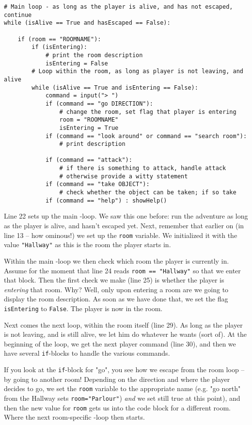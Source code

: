 \begin{lstlisting}[firstnumber=last]
# Main loop - as long as the player is alive, and has not escaped, continue
while (isAlive == True and hasEscaped == False):

    if (room == "ROOMNAME"):
        if (isEntering):
            # print the room description
            isEntering = False
        # Loop within the room, as long as player is not leaving, and alive    
        while (isAlive == True and isEntering == False):
            command = input("> ")
            if (command == "go DIRECTION"):
                # change the room, set flag that player is entering
                room = "ROOMNAME"
                isEntering = True
            if (command == "look around" or command == "search room"):
                # print description

            if (command == "attack"):
                # if there is something to attack, handle attack
                # otherwise provide a witty statement
            if (command == "take OBJECT"):
                # check whether the object can be taken; if so take
            if (command == "help") : showHelp()
\end{lstlisting}

Line 22 sets up the main \whileloop-loop. We saw this one before: run the adventure as long as the player is alive, and hasn't escaped yet. Next, remember that earlier on (in line 13 -- how ominous!) we set up the \texttt{room} variable. We initialized it with the value \texttt{"Hallway"} as this is the room the player starts in. 

Within the main \whileloop-loop we then check which room the player is currently in. Assume for the moment that line 24 reads \texttt{room == "Hallway"} so that we enter that block. Then the first check we make (line 25) is whether the player is \emph{entering} that room. Why? Well, only upon entering a room are we going to display the room description. As soon as we have done that, we set the flag \texttt{isEntering} to \texttt{False}. The player is now in the room. 

Next comes the next loop, within the room itself (line 29). As long as the player is not leaving, and is still alive, we let him do whatever he wants (sort of). At the beginning of the loop, we get the next player command (line 30), and then we have several \texttt{if}-blocks to handle the various commands. 

If you look at the \texttt{if}-block for "go", you see how we escape from the room loop -- by going to another room! Depending on the direction and where the player decides to go, we set the \texttt{room} variable to the appropriate name (e.g. "go north" from the Hallway sets \texttt{room="Parlour"}) \emph{and} we set still true at this point), and then the new value for \texttt{room} gets us into the code block for a different room. Where the next room-specific \whileloop-loop then starts.      

